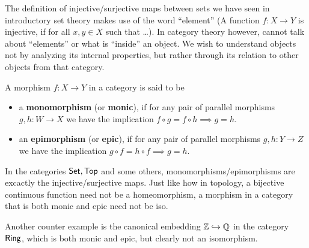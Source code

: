 The definition of injective/surjective maps between sets we have seen in introductory set theory makes use of the word ``element'' (A function $f: X \to Y$ is injective, if for all $x,y \in X$ such that \ldots).
In category theory however, cannot talk about ``elements'' or what is ``inside'' an object.
We wish to understand objects not by analyzing its internal properties, but rather through its relation to other objects from that category.

\begin{dfn}[]
A morphism $f: X \to Y$ in a category is said to be
\begin{itemize}
  \item a \textbf{monomorphism} (or \textbf{monic}), if for any pair of parallel morphisms $g,h: W \to X$ we have the implication $f \circ g =f \circ h \implies g = h$.
    \begin{center}
    \end{center}

  \item an \textbf{epimorphism} (or \textbf{epic}), if for any pair of parallel morphisms $g,h: Y \to Z$ we have the implication $g \circ f =h \circ f \implies g = h$.
    \begin{center}
    \end{center}
\end{itemize}
\end{dfn}

In the categories $\text{\sffamily Set},\text{\sffamily Top}$ and some others, monomorphisms/epimorphisms are excactly the injective/surjective maps.
Just like how in topology, a bijective continuous function need not be a homeomorphism, a morphism in a category that is both monic and epic need not be iso.

Another counter example is the canonical embedding $\mathbb{Z} \hookrightarrow \mathbb{Q}$ in the category $\text{\sffamily Ring}$, which is both monic and epic, but clearly not an isomorphism.

